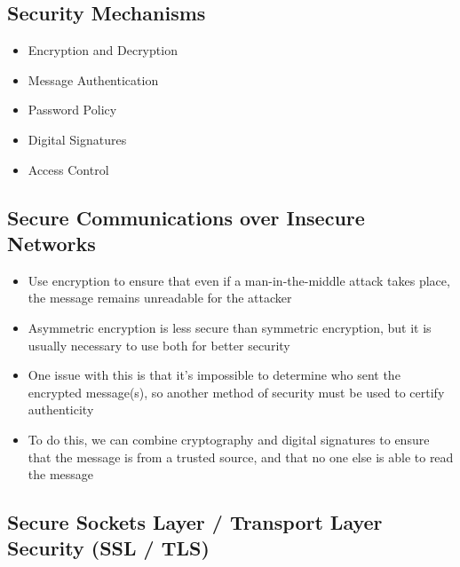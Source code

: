 \subsection*{Security Mechanisms}

\begin{itemize}
  \item Encryption and Decryption
  \item Message Authentication
  \item Password Policy
  \item Digital Signatures
  \item Access Control
\end{itemize}

\subsection*{Secure Communications over Insecure Networks}

\begin{itemize}
  \item Use encryption to ensure that even if a man-in-the-middle attack takes place, the message remains unreadable for the attacker
  \item Asymmetric encryption is less secure than symmetric encryption, but it is usually necessary to use both for better security
  \item One issue with this is that it's impossible to determine who sent the encrypted message(s), so another method of security must be used to certify authenticity
  \item To do this, we can combine cryptography and digital signatures to ensure that the message is from a trusted source, and that no one else is able to read the message
\end{itemize}

\subsection*{Secure Sockets Layer / Transport Layer Security (SSL / TLS)}

